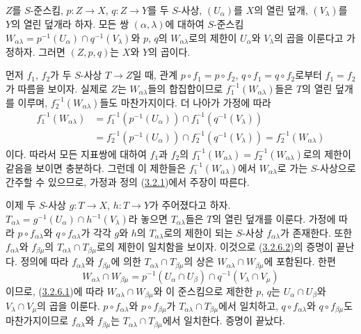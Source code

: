 \begin{lemma}[3.2.6.2]
\label{I.3.2.6.2-ko}
$Z$를 $S$-준스킴, $p:Z\to X$, $q:Z\to Y$를 두 $S$-사상,
$(U_\alpha)$를 $X$의 열린 덮개, $(V_\lambda)$를 $Y$의 열린 덮개라
하자. 모든 쌍 $(\alpha,\lambda)$에 대하여 $S$-준스킴
$W_{\alpha\lambda}=p^{-1}(U_\alpha)\cap q^{-1}(V_\lambda)$와 $p$, $q$의
$W_{\alpha\lambda}$로의 제한이 $U_\alpha$와 $V_\lambda$의 곱을
이룬다고 가정하자. 그러면 $(Z,p,q)$는 $X$와 $Y$의 곱이다.
\end{lemma}

먼저 $f_1$, $f_2$가 두 $S$-사상 $T\to Z$일 때, 관계
$p\circ f_1=p\circ f_2$, $q\circ f_1=q\circ f_2$로부터
$f_1=f_2$가 따름을 보이자. 실제로 $Z$는 $W_{\alpha\lambda}$들의
합집합이므로 $f_1^{-1}(W_{\alpha\lambda})$들은 $T$의 열린 덮개를
이루며, $f_2^{-1}(W_{\alpha\lambda})$들도 마찬가지이다. 더 나아가
가정에 따라
\[
\begin{aligned}
  f_1^{-1}(W_{\alpha\lambda})
  &=f_1^{-1}(p^{-1}(U_\alpha))\cap
    f_1^{-1}(q^{-1}(V_\lambda)) \\
  &=f_2^{-1}(p^{-1}(U_\alpha))\cap
    f_2^{-1}(q^{-1}(V_\lambda))
   =f_2^{-1}(W_{\alpha\lambda})
\end{aligned}
\]
이다. 따라서 모든 지표쌍에 대하여 $f_1$과 $f_2$의
$f_1^{-1}(W_{\alpha\lambda})=f_2^{-1}(W_{\alpha\lambda})$로의 제한이
같음을 보이면 충분하다. 그런데 이 제한들은
$f_1^{-1}(W_{\alpha\lambda})$에서 $W_{\alpha\lambda}$로 가는
$S$-사상으로 간주할 수 있으므로, 가정과 정의
(\hyperref[I.3.2.1-ko]{3.2.1})에서 주장이 따른다.

이제 두 $S$-사상 $g:T\to X$, $h:T\to Y$가 주어졌다고 하자.
$T_{\alpha\lambda}=g^{-1}(U_\alpha)\cap h^{-1}(V_\lambda)$라 놓으면
$T_{\alpha\lambda}$들은 $T$의 열린 덮개를 이룬다. 가정에 따라
$p\circ f_{\alpha\lambda}$와 $q\circ f_{\alpha\lambda}$가 각각
$g$와 $h$의 $T_{\alpha\lambda}$로의 제한이 되는 $S$-사상
$f_{\alpha\lambda}$가 존재한다. 또한 $f_{\alpha\lambda}$와
$f_{\beta\mu}$의 $T_{\alpha\lambda}\cap T_{\beta\mu}$로의 제한이
일치함을 보이자. 이것으로 (\hyperref[I.3.2.6.2-ko]{3.2.6.2})의
증명이 끝난다. 정의에 따라 $f_{\alpha\lambda}$와
$f_{\beta\mu}$에 의한 $T_{\alpha\lambda}\cap T_{\beta\mu}$의 상은
$W_{\alpha\lambda}\cap W_{\beta\mu}$에 포함된다. 한편
\[
  W_{\alpha\lambda}\cap W_{\beta\mu}
  =p^{-1}(U_\alpha\cap U_\beta)\cap
   q^{-1}(V_\lambda\cap V_\mu)
\]
이므로, (\hyperref[I.3.2.6.1-ko]{3.2.6.1})에 따라
$W_{\alpha\lambda}\cap W_{\beta\mu}$와 이 준스킴으로 제한한 $p$,
$q$는 $U_\alpha\cap U_\beta$와 $V_\lambda\cap V_\mu$의 곱을
이룬다. $p\circ f_{\alpha\lambda}$와 $p\circ f_{\beta\mu}$가
$T_{\alpha\lambda}\cap T_{\beta\mu}$에서 일치하고,
$q\circ f_{\alpha\lambda}$와 $q\circ f_{\beta\mu}$도 마찬가지이므로
$f_{\alpha\lambda}$와 $f_{\beta\mu}$는
$T_{\alpha\lambda}\cap T_{\beta\mu}$에서 일치한다. 증명이 끝났다.

